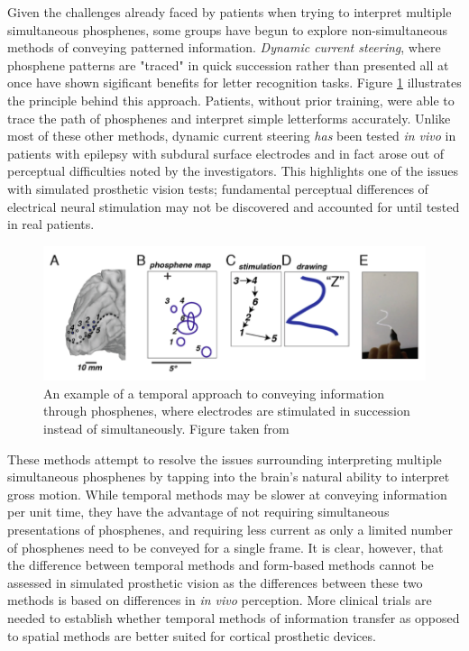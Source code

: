 \documentclass[a4paper,11pt,openany]{book}
\begin{document}
Given the challenges already faced by patients when trying to interpret multiple simultaneous phosphenes, some groups have begun to explore non-simultaneous methods of conveying patterned information.
\emph{Dynamic current steering}, where phosphene patterns are "traced" in quick succession rather than presented all at once have shown sigificant benefits for letter recognition tasks. \cite{beauchamp_dynamic_2018,spencer_creating_2018}
Figure \ref{fig:org9b68703} illustrates the principle behind this approach.
Patients, without prior training, were able to trace the path of phosphenes and interpret simple letterforms accurately.
Unlike most of these other methods, dynamic current steering \emph{has} been tested \emph{in vivo} in patients with epilepsy with subdural surface electrodes and in fact arose out of perceptual difficulties noted by the investigators. \cite{beauchamp_dynamic_2018}
This highlights one of the issues with simulated prosthetic vision tests; fundamental perceptual differences of electrical neural stimulation may not be discovered and accounted for until tested in real patients.

\begin{figure}[htbp]
\centering
\includegraphics[width=.9\linewidth]{./graphics/litreview/temporal.png}
\caption[Example of conveying information temporally through phosphenes]{\label{fig:org9b68703}
An example of a temporal approach to conveying information through phosphenes, where electrodes are stimulated in succession instead of simultaneously. Figure taken from \cite{beauchamp_dynamic_2018}}
\end{figure}

These methods attempt to resolve the issues surrounding interpreting multiple simultaneous phosphenes by tapping into the brain's natural ability to interpret gross motion. \cite{grossman_brain_2002}
While temporal methods may be slower at conveying information per unit time, they have the advantage of not requiring simultaneous presentations of phosphenes, and requiring less current as only a limited number of phosphenes need to be conveyed for a single frame.
It is clear, however, that the difference between temporal methods and form-based methods cannot be assessed in simulated prosthetic vision as the differences between these two methods is based on differences in \emph{in vivo} perception.
More clinical trials are needed to establish whether temporal methods of information transfer as opposed to spatial methods are better suited for cortical prosthetic devices.
\end{document}
